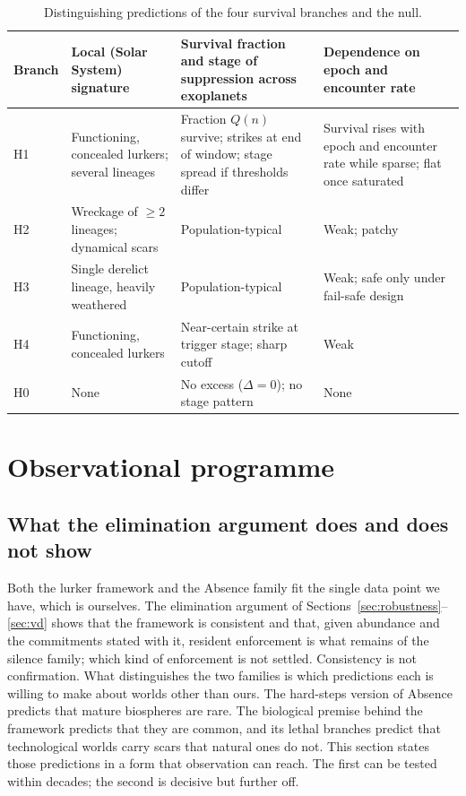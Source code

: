 \documentclass[preprint,12pt]{elsarticle}
\theoremstyle{definition}
\begin{document}
\begin{table}[!htbp]
\centering
\caption{Distinguishing predictions of the four survival branches and the null.}
\label{tab:branches}
\small
\begin{tabularx}{\textwidth}{@{}lXXX@{}}
\toprule
Branch & Local (Solar System) signature & Survival fraction and stage of suppression across exoplanets & Dependence on epoch and encounter rate \\
\midrule
H1 & Functioning, concealed lurkers; several lineages & Fraction $Q(n)$ survive; strikes at end of window; stage spread if thresholds differ & Survival rises with epoch and encounter rate while sparse; flat once saturated \\
H2 & Wreckage of $\geq 2$ lineages; dynamical scars & Population-typical & Weak; patchy \\
H3 & Single derelict lineage, heavily weathered & Population-typical & Weak; safe only under fail-safe design \\
H4 & Functioning, concealed lurkers & Near-certain strike at trigger stage; sharp cutoff & Weak \\
H0 & None & No excess ($\Delta = 0$); no stage pattern & None \\
\bottomrule
\end{tabularx}
\end{table}

\section{Observational programme}
\label{sec:falsifier}

\subsection{What the elimination argument does and does not show}

Both the lurker framework and the Absence family fit the single data point we have, which is ourselves. The elimination argument of Sections~\ref{sec:robustness}--\ref{sec:vd} shows that the framework is consistent and that, given abundance and the commitments stated with it, resident enforcement is what remains of the silence family; which kind of enforcement is not settled. Consistency is not confirmation. What distinguishes the two families is which predictions each is willing to make about worlds other than ours. The hard-steps version of Absence predicts that mature biospheres are rare. The biological premise behind the framework predicts that they are common, and its lethal branches predict that technological worlds carry scars that natural ones do not. This section states those predictions in a form that observation can reach. The first can be tested within decades; the second is decisive but further off.
\end{document}
